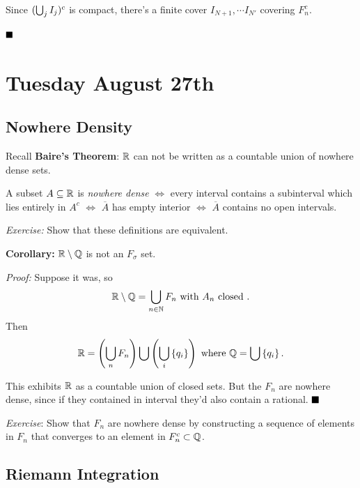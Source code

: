 Since \((\bigcup_j I_j)^c\) is compact, there's a finite cover
\(I_{N+1}, \cdots I_{N'}\) covering \(F_n^c\).

\(\qed\)

\hypertarget{tuesday-august-27th}{%
\section{Tuesday August 27th}\label{tuesday-august-27th}}

\hypertarget{nowhere-density}{%
\subsection{Nowhere Density}\label{nowhere-density}}

Recall \textbf{Baire's Theorem}: \({\mathbb{R}}\) can not be written as a
countable union of nowhere dense sets.

A subset \(A\subseteq {\mathbb{R}}\) is \emph{nowhere dense} \(\iff\) every
interval contains a subinterval which lies entirely in \(A^c\) \(\iff\)
\(\overline A\) has empty interior \(\iff\) \(\overline A\) contains no
open intervals.

\emph{Exercise:} Show that these definitions are equivalent.

\textbf{Corollary:} \({\mathbb{R}}\setminus{\mathbb{Q}}\) is not an \(F_\sigma\) set.

\emph{Proof:} Suppose it was, so
\begin{align*}
{\mathbb{R}}\setminus {\mathbb{Q}} = \bigcup_{n\in{\mathbb{N}}} F_n \text{ with } A_n \text{ closed }
.\end{align*} Then
\begin{align*}
{\mathbb{R}} = \left( \bigcup_n F_n\right) \bigcup \left( \bigcup_i \left\{{q_i}\right\} \right)
\text{ where } {\mathbb{Q}} = \bigcup \left\{{q_i}\right\}
.\end{align*}

This exhibits \({\mathbb{R}}\) as a countable union of closed sets. But the
\(F_n\) are nowhere dense, since if they contained in interval they'd
also contain a rational. \(\qed\)

\emph{Exercise}: Show that \(F_n\) are nowhere dense by constructing a
sequence of elements in \(F_n\) that converges to an element in
\(F_n^c \subset {\mathbb{Q}}\).

\hypertarget{riemann-integration}{%
\subsection{Riemann Integration}\label{riemann-integration}}

